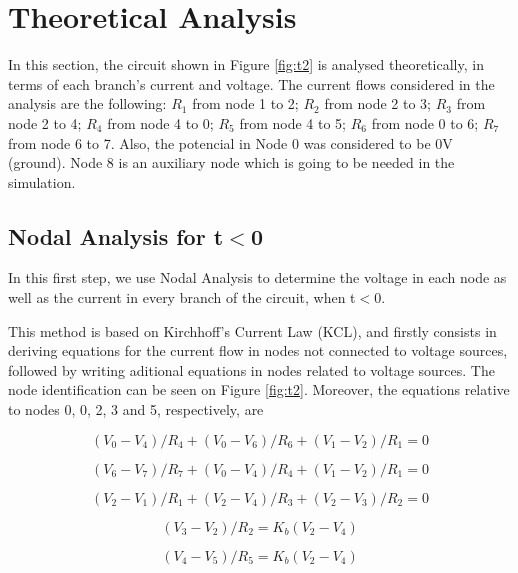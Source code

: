 \section{Theoretical Analysis}
\label{sec:analysis}

In this section, the circuit shown in Figure \ref{fig:t2} is analysed
theoretically, in terms of each branch's current and voltage.
The current flows considered in the analysis are the following:
$R_1$ from node 1 to 2; $R_2$ from node 2 to 3; $R_3$ from node 2 to 4; $R_4$ from node 4 to 0; $R_5$ from node 4 to 5; $R_6$ from node 0 to 6; $R_7$ from node 6 to 7. Also, the potencial in Node 0 was considered to be 0V (ground). Node 8 is an auxiliary node which is going to be needed in the simulation.

\subsection{Nodal Analysis for t$<$0}

In this first step, we use Nodal Analysis to determine the voltage in each node as well as the current in every branch of the circuit, when t$<$0. \par 
This method is based on Kirchhoff's Current Law (KCL), and firstly consists in
deriving equations for the current flow in nodes not connected to voltage sources,
followed by writing aditional equations in nodes related to voltage sources. The node 
identification can be seen on Figure \ref{fig:t2}. Moreover, the equations relative to
nodes 0, 0, 2, 3 and 5, respectively, are

\begin{equation}
  (V_0 - V_4)/R_4 + (V_0 - V_6)/R_6 + (V_1 - V_2)/R_1 = 0 
  \label{eq:kvl1}
\end{equation}

\begin{equation}
  (V_6 - V_7)/R_7 + (V_0 - V_4)/R_4 + (V_1 - V_2)/R_1 = 0 
  \label{eq:kvl2}
\end{equation}

\begin{equation}
  (V_2 - V_1)/R_1 + (V_2 - V_4)/R_3 + (V_2 - V_3)/R_2 = 0
  \label{eq:kvl3}
\end{equation}

\begin{equation}
  (V_3 - V_2)/R_2 = K_b(V_2 - V_4)
  \label{eq:kvl4}
\end{equation}

\begin{equation}
  (V_4 - V_5)/R_5 = K_b(V_2 - V_4)
  \label{eq:kvl5}
\end{equation}


